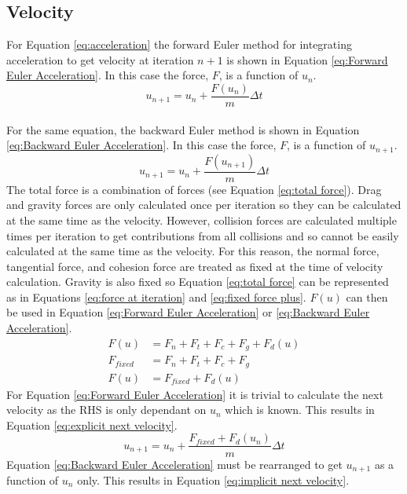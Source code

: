 \documentclass[a4paper,11pt,titlepage]{report}
\begin{document}
\subsection{Velocity}
For Equation \ref{eq:acceleration} the forward Euler method for integrating acceleration to get velocity at iteration $n + 1$ is shown in Equation \ref{eq:Forward Euler Acceleration}. In this case the force, $F$, is a function of $u_n$.
\begin{equation}
u_{n+1} = u_{n} + \dfrac{F(u_n)}{m}\Delta t
\label{eq:Forward Euler Acceleration}
\end{equation}
\\For the same equation, the backward Euler method is shown in Equation \ref{eq:Backward Euler Acceleration}. In this case the force, $F$, is a function of $u_{n+1}$.
\begin{equation}
u_{n+1} = u_{n} + \dfrac{F(u_{n+1})}{m}\Delta t
\label{eq:Backward Euler Acceleration}
\end{equation}
The total force is a combination of forces (see Equation \ref{eq:total force}). Drag and gravity forces are only calculated once per iteration so they can be calculated at the same time as the velocity. However, collision forces are calculated multiple times per iteration to get contributions from all collisions and so cannot be easily calculated at the same time as the velocity. For this reason, the normal force, tangential force, and cohesion force are treated as fixed at the time of velocity calculation. Gravity is also fixed so Equation \ref{eq:total force} can be represented as in Equations \ref{eq:force at iteration} and \ref{eq:fixed force plus}. $F(u)$ can then be used in Equation \ref{eq:Forward Euler Acceleration} or \ref{eq:Backward Euler Acceleration}.
\begin{align}
F(u) &= F_n + F_t + F_c + F_g + F_d(u)
\label{eq:force at iteration} \\
F_{fixed} &= F_n + F_t + F_c + F_g \\
F(u) &= F_{fixed} + F_d(u) \label{eq:fixed force plus}
\end{align}
For Equation \ref{eq:Forward Euler Acceleration} it is trivial to calculate the next velocity as the RHS is only dependant on $u_n$ which is known. This results in Equation \ref{eq:explicit next velocity}.
\begin{equation}
u_{n+1} = u_n + \dfrac{F_{fixed} + F_d(u_n)}{m} \Delta t \label{eq:explicit next velocity}
\end{equation}
Equation \ref{eq:Backward Euler Acceleration} must be rearranged to get $u_{n+1}$ as a function of $u_{n}$ only. This results in Equation \ref{eq:implicit next velocity}.
\end{document}
